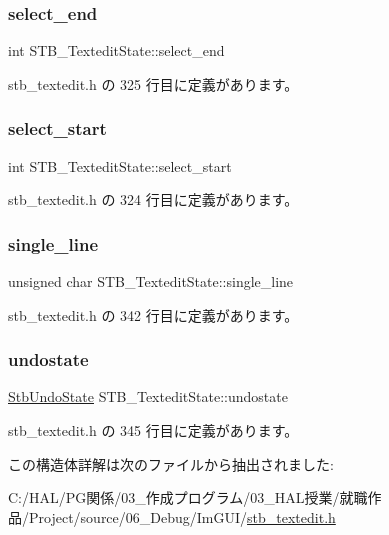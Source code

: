 \subsubsection{\texorpdfstring{select\+\_\+end}{select\_end}}
{\footnotesize\ttfamily int S\+T\+B\+\_\+\+Textedit\+State\+::select\+\_\+end}



 stb\+\_\+textedit.\+h の 325 行目に定義があります。

\mbox{\label{struct_s_t_b___textedit_state_a74d595403e0b6f99cd0163ee87f4344d}} 
\subsubsection{\texorpdfstring{select\+\_\+start}{select\_start}}
{\footnotesize\ttfamily int S\+T\+B\+\_\+\+Textedit\+State\+::select\+\_\+start}



 stb\+\_\+textedit.\+h の 324 行目に定義があります。

\mbox{\label{struct_s_t_b___textedit_state_a63299aca2cb4e009dfa41cda5e651316}} 
\subsubsection{\texorpdfstring{single\+\_\+line}{single\_line}}
{\footnotesize\ttfamily unsigned char S\+T\+B\+\_\+\+Textedit\+State\+::single\+\_\+line}



 stb\+\_\+textedit.\+h の 342 行目に定義があります。

\mbox{\label{struct_s_t_b___textedit_state_a7e1f0366bbd57e01a4f49a720beb9ead}} 
\subsubsection{\texorpdfstring{undostate}{undostate}}
{\footnotesize\ttfamily \mbox{\hyperlink{struct_stb_undo_state}{Stb\+Undo\+State}} S\+T\+B\+\_\+\+Textedit\+State\+::undostate}



 stb\+\_\+textedit.\+h の 345 行目に定義があります。



この構造体詳解は次のファイルから抽出されました\+:\begin{DoxyCompactItemize}
\item 
C\+:/\+H\+A\+L/\+P\+G関係/03\+\_\+作成プログラム/03\+\_\+\+H\+A\+L授業/就職作品/\+Project/source/06\+\_\+\+Debug/\+Im\+G\+U\+I/\mbox{\hyperlink{stb__textedit_8h}{stb\+\_\+textedit.\+h}}\end{DoxyCompactItemize}
